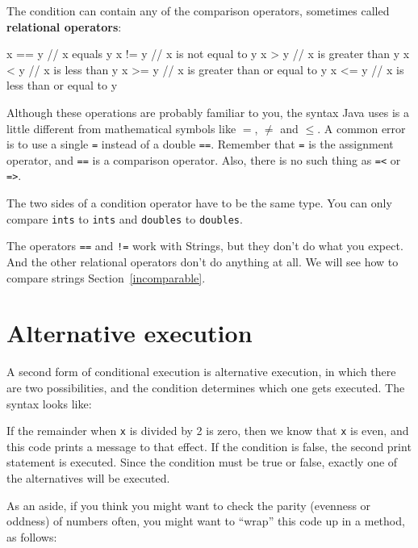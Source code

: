 The condition can contain any of the comparison operators,
sometimes called {\bf relational operators}:

\begin{code}
    x == y               // x equals y
    x != y               // x is not equal to y
    x > y                // x is greater than y
    x < y                // x is less than y
    x >= y               // x is greater than or equal to y
    x <= y               // x is less than or equal to y
\end{code}
%
Although these operations are probably familiar to you, the
syntax Java uses is a little different from mathematical
symbols like $=$, $\neq$ and $\le$.  A common error is
to use a single {\tt =} instead of a double {\tt ==}.  Remember
that {\tt =} is the assignment operator, and {\tt ==} is
a comparison operator.  Also, there is no such thing as
{\tt =<} or {\tt =>}.

The two sides of a condition operator have to be the same
type.  You can only compare {\tt ints} to {\tt ints} and
{\tt doubles} to {\tt doubles}.

The operators {\tt ==} and {\tt !=} work with Strings, but they
don't do what you expect.  And the other relational operators
don't do anything at all.
We will see how to compare strings Section~\ref{incomparable}.


\section {Alternative execution}
\label{alternative}

A second form of conditional execution is alternative execution,
in which there are two possibilities, and the condition determines
which one gets executed.  The syntax looks like:

%
If the remainder when {\tt x} is divided by 2 is zero, then
we know that {\tt x} is even, and this code prints a message
to that effect.  If the condition is false, the second
print statement is executed.  Since the condition must
be true or false, exactly one of the alternatives will be
executed.

As an aside, if you think you might want to check the parity
(evenness or oddness) of numbers often, you might want to
``wrap'' this code up in a method, as follows:

